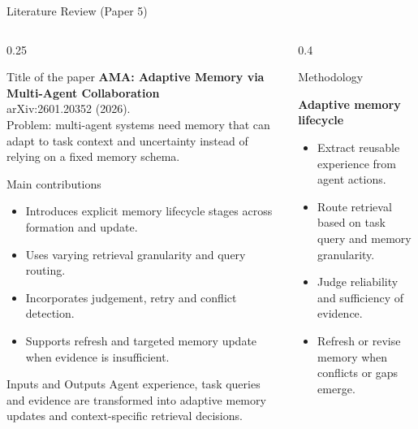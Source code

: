 \begin{frame}{Literature Review (Paper 5)}
\begin{columns}[T]
  \begin{column}{0.25\textwidth}
    \begin{block}{Title of the paper \cite{ama26}}
      \tiny \textbf{AMA: Adaptive Memory via Multi-Agent Collaboration}\\[2pt] arXiv:2601.20352 (2026).\\[2pt] Problem: multi-agent systems need memory that can adapt to task context and uncertainty instead of relying on a fixed memory schema.
    \end{block}
    \vspace{0.12cm}
    \begin{block}{Main contributions}
      \tiny
      \begin{itemize}\setlength\itemsep{1pt}
      \item Introduces explicit memory lifecycle stages across formation and update.
\item Uses varying retrieval granularity and query routing.
\item Incorporates judgement, retry and conflict detection.
\item Supports refresh and targeted memory update when evidence is insufficient.
      \end{itemize}
    \end{block}
    \vspace{0.12cm}
    \begin{block}{Inputs and Outputs}
      \tiny Agent experience, task queries and evidence are transformed into adaptive memory updates and context-specific retrieval decisions.
    \end{block}
  \end{column}

  \begin{column}{0.4\textwidth}
    \begin{block}{Methodology}
    \tiny
    \begin{center}
    \textbf{Adaptive memory lifecycle}
    \end{center}
    \begin{itemize}\setlength\itemsep{1pt}
    \item Extract reusable experience from agent actions.
\item Route retrieval based on task query and memory granularity.
\item Judge reliability and sufficiency of evidence.
\item Refresh or revise memory when conflicts or gaps emerge.
    \end{itemize}
    \end{block}


\end{column}
\end{columns}
\end{frame}
